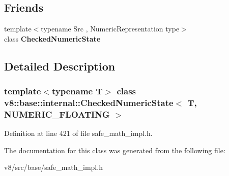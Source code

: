 \subsection*{Friends}
\begin{DoxyCompactItemize}
\item 
\mbox{\label{classv8_1_1base_1_1internal_1_1CheckedNumericState_3_01T_00_01NUMERIC__FLOATING_01_4_aa1362ebca148abcec1d121fc04fb976b}} 
{\footnotesize template$<$typename Src , Numeric\+Representation type$>$ }\\class {\bfseries Checked\+Numeric\+State}
\end{DoxyCompactItemize}


\subsection{Detailed Description}
\subsubsection*{template$<$typename T$>$\newline
class v8\+::base\+::internal\+::\+Checked\+Numeric\+State$<$ T, N\+U\+M\+E\+R\+I\+C\+\_\+\+F\+L\+O\+A\+T\+I\+N\+G $>$}



Definition at line 421 of file safe\+\_\+math\+\_\+impl.\+h.



The documentation for this class was generated from the following file\+:\begin{DoxyCompactItemize}
\item 
v8/src/base/safe\+\_\+math\+\_\+impl.\+h\end{DoxyCompactItemize}
